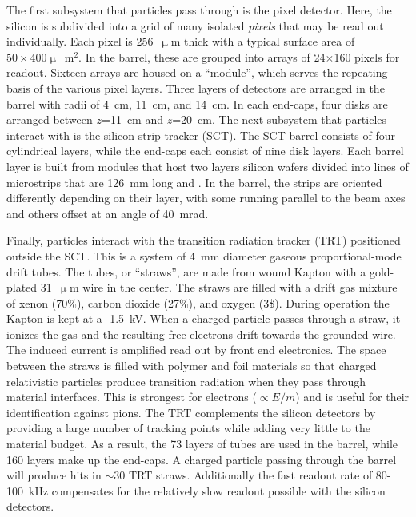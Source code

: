 The first subsystem that particles pass through is the pixel detector.
Here, the silicon is subdivided into a grid of many isolated \emph{pixels} that may be read out individually.
Each pixel is 256~$\upmu$m thick with a typical surface area of $50\times400\upmu$~m$^2$.
In the barrel, these are grouped into arrays of 24$\times$160 pixels for readout.
Sixteen arrays are housed on a ``module'', which serves the repeating basis of the various pixel layers.
Three layers of detectors are arranged in the barrel with radii of 4~cm, 11~cm, and 14~cm.
In each end-caps, four disks are arranged between $z$=11~cm and $z$=20~cm.
\cite{pixel}
The next subsystem that particles interact with is the silicon-strip tracker (SCT).
The SCT barrel consists of four cylindrical layers, while the end-caps each consist of nine disk layers.
Each barrel layer is built from modules that host two layers silicon wafers divided into lines of microstrips that are 126~mm long and .
In the barrel, the strips are oriented differently depending on their layer, with some running parallel to the beam axes and others offset at an angle of 40~mrad. \cite{sct}

Finally, particles interact with the transition radiation tracker (TRT) positioned outside the SCT.
This is a system of 4~mm diameter gaseous proportional-mode drift tubes.
The tubes, or ``straws'', are made from wound Kapton with a gold-plated 31~$\upmu$m wire in the center.
The straws are filled with a drift gas mixture of xenon (70\%), carbon dioxide (27\%), and oxygen (3\$).
During operation the Kapton is kept at a -1.5~kV.
When a charged particle passes through a straw, it ionizes the gas and the resulting free electrons drift towards the grounded wire.
The induced current is amplified read out by front end electronics.
The space between the straws is filled with polymer and foil materials so that charged relativistic particles produce transition radiation when they pass through material interfaces.
This is strongest for electrons ($\propto E/m$) and is useful for their identification against pions.
The TRT complements the silicon detectors by providing a large number of tracking points while adding very little to the material budget.
As a result, the 73 layers of tubes are used in the barrel, while 160 layers make up the end-caps.
A charged particle passing through the barrel will produce hits in $\sim30$ TRT straws.
Additionally the fast readout rate of 80-100~kHz compensates for the relatively slow readout possible with the silicon detectors.
\cite{trt} 

